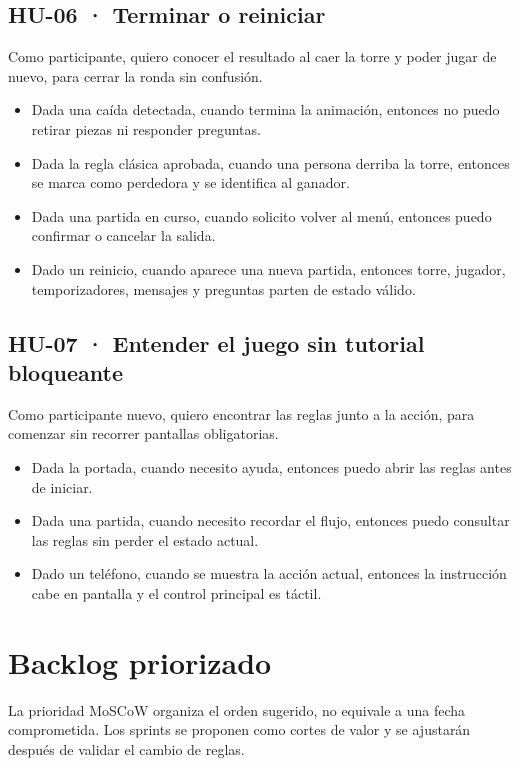 \documentclass[11pt,letterpaper]{article}
\begin{document}
\subsection*{HU-06 · Terminar o reiniciar}
Como participante, quiero conocer el resultado al caer la torre y poder jugar de nuevo, para cerrar la ronda sin confusión.
\begin{itemize}
  \item Dada una caída detectada, cuando termina la animación, entonces no puedo retirar piezas ni responder preguntas.
  \item Dada la regla clásica aprobada, cuando una persona derriba la torre, entonces se marca como perdedora y se identifica al ganador.
  \item Dada una partida en curso, cuando solicito volver al menú, entonces puedo confirmar o cancelar la salida.
  \item Dado un reinicio, cuando aparece una nueva partida, entonces torre, jugador, temporizadores, mensajes y preguntas parten de estado válido.
\end{itemize}

\subsection*{HU-07 · Entender el juego sin tutorial bloqueante}
Como participante nuevo, quiero encontrar las reglas junto a la acción, para comenzar sin recorrer pantallas obligatorias.
\begin{itemize}
  \item Dada la portada, cuando necesito ayuda, entonces puedo abrir las reglas antes de iniciar.
  \item Dada una partida, cuando necesito recordar el flujo, entonces puedo consultar las reglas sin perder el estado actual.
  \item Dado un teléfono, cuando se muestra la acción actual, entonces la instrucción cabe en pantalla y el control principal es táctil.
\end{itemize}

\section{Backlog priorizado}

La prioridad MoSCoW organiza el orden sugerido, no equivale a una fecha comprometida. Los sprints se proponen como cortes de valor y se ajustarán después de validar el cambio de reglas.
\end{document}
